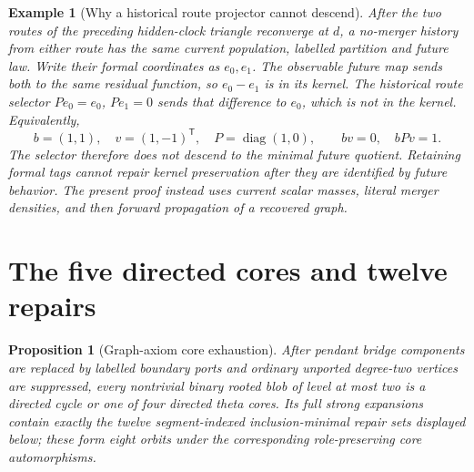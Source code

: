 \documentclass[11pt]{article}
\newtheorem{proposition}[theorem]{Proposition}
\newtheorem{example}[theorem]{Example}
\begin{document}
\begin{example}[Why a historical route projector cannot descend]
After the two routes of the preceding hidden-clock triangle reconverge at $d$, a no-merger history from either route has the same current population, labelled partition and future law. Write their formal coordinates as $e_0,e_1$. The observable future map sends both to the same residual function, so $e_0-e_1$ is in its kernel. The historical route selector $P e_0=e_0$, $P e_1=0$ sends that difference to $e_0$, which is not in the kernel. Equivalently,
\[
 b=(1,1),\quad v=(1,-1)^{\mathsf T},\quad P=\operatorname{diag}(1,0),\qquad bv=0,\quad bPv=1.
\]
The selector therefore does not descend to the minimal future quotient. Retaining formal tags cannot repair kernel preservation after they are identified by future behavior. The present proof instead uses current scalar masses, literal merger densities, and then forward propagation of a recovered graph.
\end{example}

\section{The five directed cores and twelve repairs}
\label{sec:table}

\begin{proposition}[Graph-axiom core exhaustion]
\label{prop:core-exhaustion-supp}
After pendant bridge components are replaced by labelled boundary ports and
ordinary unported degree-two vertices are suppressed, every nontrivial binary
rooted blob of level at most two is a directed cycle or one of four directed
theta cores.  Its full strong expansions contain exactly the twelve
segment-indexed inclusion-minimal repair sets displayed below; these form
eight orbits under the corresponding role-preserving core automorphisms.
\end{proposition}
\end{document}
